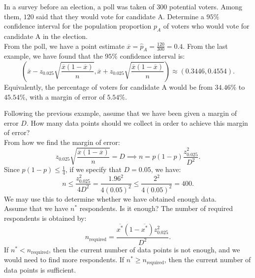\documentclass{huhtakm-template-book-v2}
\begin{document}
    \begin{eg}
        In a survey before an election, a poll was taken of $300$ potential voters. Among them, $120$ said that they would vote for candidate A. Determine a $95\%$ confidence interval for the population proportion $p_{A}$ of voters who would vote for candidate A in the election.\\
        From the poll, we have a point estimate $\overline{x} = \hat{p}_{A} = \frac{120}{300} = 0.4$. From the last example, we have found that the $95\%$ confidence interval is:
        \begin{equation*}
            \left(\overline{x} - z_{0.025} \sqrt{\frac{\overline{x}(1 - \overline{x})}{n}}, \overline{x} + z_{0.025} \sqrt{\frac{\overline{x}(1 - \overline{x})}{n}}\right) \approx (0.3446, 0.4554).
        \end{equation*}
        Equivalently, the percentage of voters for candidate A would be from $34.46\%$ to $45.54\%$, with a margin of error of $5.54\%$.
    \end{eg}
    \begin{eg}
        Following the previous example, assume that we have been given a margin of error $D$. How many data points should we collect in order to achieve this margin of error?\\
        From how we find the margin of error:
        \begin{equation*}
            z_{0.025} \sqrt{\frac{\overline{x}(1 - \overline{x})}{n}} = D \implies n = p(1 - p) \frac{z_{0.025}^{2}}{D^{2}}.
        \end{equation*}
        Since $p(1 - p) \leq \frac{1}{4}$, if we specify that $D = 0.05$, we have:
        \begin{equation*}
            n \leq \frac{z_{0.025}^{2}}{4D^{2}} = \frac{1.96^{2}}{4(0.05)^{2}} \leq \frac{2^{2}}{4(0.05)^{2}} = 400.
        \end{equation*}
        We may use this to determine whether we have obtained enough data.\\
        Assume that we have $n^{*}$ respondents. Is it enough? The number of required respondents is obtained by:
        \begin{equation*}
            n_{\text{required}} = \frac{\overline{x^{*}}(1 - \overline{x^{*}}) z_{0.025}^{2}}{D^{2}}.
        \end{equation*}
        If $n^{*} < n_{\text{required}}$, then the current number of data points is not enough, and we would need to find more respondents. If $n^{*} \geq n_{\text{required}}$, then the current number of data points is sufficient.
    \end{eg}
    \newpage
\end{document}
